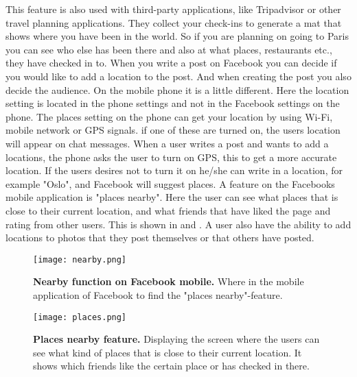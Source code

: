This feature is also used with third-party applications, like Tripadvisor or other travel planning applications. They collect your check-ins to generate a mat that shows where you have been in the world. So if you are planning on going to Paris you can see who else has been there and also at what places, restaurants etc., they have checked in to. 
When you write a post on Facebook you can decide if you would like to add a location to the post. And when creating the post you also decide the audience. On the mobile phone it is a little different. Here the location setting is located in the phone settings and not in the Facebook settings on the phone. The places setting on the phone can get your location by using Wi-Fi, mobile network or GPS signals. if one of these are turned on, the users location will appear on chat messages. When a user writes a post and wants to add a locations, the phone asks the user to turn on GPS, this to get a more accurate location. If the users desires not to turn it on he/she can write in a location, for example "Oslo", and Facebook will suggest places. A feature on the Facebooks mobile application is "places nearby". Here the user can see what places that is close to their current location, and what friends that have liked the page and rating from other users. This is shown in  and . A user also have the ability to add locations to photos that they post themselves or that others have posted. 

\begin{figure}[h!]
\centering
\texttt{[image: nearby.png]}
\caption[Nearby function on Facebook mobile]{\textbf{Nearby function on Facebook mobile.}  Where in the mobile application of Facebook to find the "places nearby"-feature.  } 
\label{fig:nearby}
\end{figure}

\begin{figure}[h!]
\centering
\texttt{[image: places.png]}
\caption [Places nearby feature]{\textbf{Places nearby feature.} Displaying the screen where the users can see what kind of places that is close to their current location. It shows which friends like the certain place or has checked in there.} 
\label{fig:places}
\end{figure}

